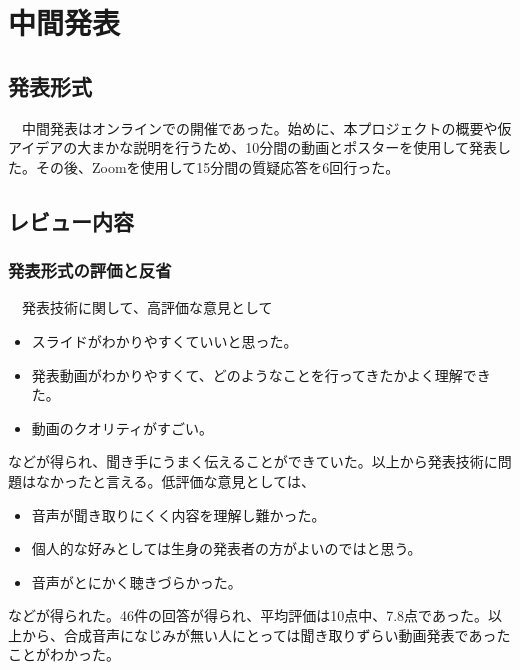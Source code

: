 \chapter{中間発表}

\section{発表形式}
　中間発表はオンラインでの開催であった。始めに、本プロジェクトの概要や仮アイデアの大まかな説明を行うため、10分間の動画とポスターを使用して発表した。その後、Zoomを使用して15分間の質疑応答を6回行った。

\section{レビュー内容}
\subsection{発表形式の評価と反省}
　発表技術に関して、高評価な意見として
\begin{itemize}
    \item スライドがわかりやすくていいと思った。
    \item 発表動画がわかりやすくて、どのようなことを行ってきたかよく理解できた。
    \item 動画のクオリティがすごい。
\end{itemize}
などが得られ、聞き手にうまく伝えることができていた。以上から発表技術に問題はなかったと言える。低評価な意見としては、
\begin{itemize}
    \item 音声が聞き取りにくく内容を理解し難かった。
    \item 個人的な好みとしては生身の発表者の方がよいのではと思う。
    \item 音声がとにかく聴きづらかった。
\end{itemize}
などが得られた。46件の回答が得られ、平均評価は10点中、7.8点であった。以上から、合成音声になじみが無い人にとっては聞き取りずらい動画発表であったことがわかった。

